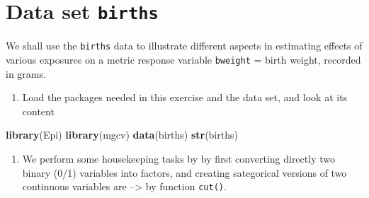 \documentclass[
]{book}
\newenvironment{Shaded}{\begin{snugshade}}{\end{snugshade}}
\newcommand{\AttributeTok}[1]{\textcolor[rgb]{0.13,0.29,0.53}{#1}}
\newcommand{\ConstantTok}[1]{\textcolor[rgb]{0.56,0.35,0.01}{#1}}
\newcommand{\DecValTok}[1]{\textcolor[rgb]{0.00,0.00,0.81}{#1}}
\newcommand{\FunctionTok}[1]{\textcolor[rgb]{0.13,0.29,0.53}{\textbf{#1}}}
\newcommand{\NormalTok}[1]{#1}
\newcommand{\OtherTok}[1]{\textcolor[rgb]{0.56,0.35,0.01}{#1}}
\newcommand{\SpecialCharTok}[1]{\textcolor[rgb]{0.81,0.36,0.00}{\textbf{#1}}}
\newcommand{\StringTok}[1]{\textcolor[rgb]{0.31,0.60,0.02}{#1}}
\providecommand{\tightlist}{%
  \setlength{\itemsep}{0pt}\setlength{\parskip}{0pt}}
\begin{document}
\section{\texorpdfstring{Data set \texttt{births}}{Data set births}}\label{data-set-births}

We shall use the \texttt{births} data to illustrate
different aspects in estimating effects of various exposures on a metric response variable
\texttt{bweight} = birth weight, recorded in grams.

\begin{enumerate}
\def\labelenumi{\arabic{enumi}.}
\tightlist
\item
  Load the packages needed in this exercise and the data set, and look at its content
\end{enumerate}

\begin{Shaded}
\begin{Highlighting}[]
\FunctionTok{library}\NormalTok{(Epi)}
\FunctionTok{library}\NormalTok{(mgcv)}
\FunctionTok{data}\NormalTok{(births)}
\FunctionTok{str}\NormalTok{(births)}
\end{Highlighting}
\end{Shaded}

\begin{enumerate}
\def\labelenumi{\arabic{enumi}.}
\setcounter{enumi}{1}
\tightlist
\item
  We perform some housekeeping tasks by
  by first converting directly two binary (0/1) variables into factors,
  and creating sategorical versions of two continuous variables are --\textgreater{}
  by function \texttt{cut()}.
\end{enumerate}

\begin{Shaded}
\end{Shaded}
\end{document}
